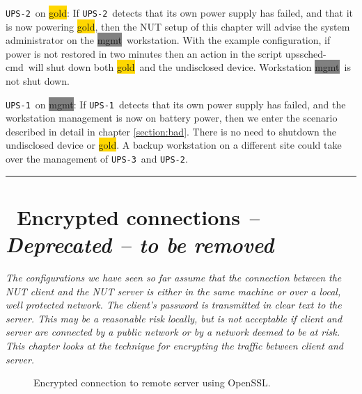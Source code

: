 \documentclass[12pt]{article}
\newlength{\headersep}\setlength{\headersep}{3mm}
\newcommand{\Hsep}{\hspace{\headersep}}
\newcommand{\newcolumn}{\vfill\eject}
\newcommand{\upsschedcmd}{\mbox{\textcolor{CMDCOLOUR}{upssched-cmd}}}
\newcommand{\gold}[1][gold]{\colorbox{GOLD}{#1}}
\newcommand{\mgmt}[1][mgmt]{\colorbox{GRAY}{#1}}
\newcommand{\UPSi}{\texttt{UPS-1}}
\newcommand{\UPSii}{\texttt{UPS-2}}
\newcommand{\UPSiii}{\texttt{UPS-3}}
\newcommand{\Ref}[1]{\ref{#1}}
\begin{document}
\UPSii\ on \gold: If \UPSii\ detects that its own power supply has failed, and
that it is now powering \gold, then the NUT setup of this chapter will advise
the system administrator on the \mgmt\ workstation.  With the example
configuration, if power is not restored in two minutes then an action in the
script \upsschedcmd\ will shut down both \gold\ and the undisclosed device.
Workstation \mgmt\ is not shut down.

\UPSi\ on \mgmt: If \UPSi\ detects that its own power supply has failed, and
the workstation management is now on battery power, then we enter the scenario
described in detail in chapter \Ref{section:bad}.  There is no need to shutdown
the undisclosed device or \gold.  A backup workstation on a different site
could take over the management of \UPSiii\ and \UPSii.

\vspace*{\fill}
\begin{center}\rule{\LinePrinterwidth}{0.5mm}\end{center}
\vspace*{\fill}

\begin{center}
\end{center}

\vspace*{\fill}


\newcolumn
\section{\Hsep\ Encrypted connections \textit{ -- Deprecated -- to be removed}}\label{section:SSL}

\textsl{The configurations we have seen so far assume that the
  connection between the NUT client and the NUT server is either in
  the same machine or over a local, well protected network.  The
  client's password is transmitted in clear text to the server.  This
  may be a reasonable risk locally, but is not acceptable if client
  and server are connected by a public network or by a network deemed
  to be at risk.  This chapter looks at the technique for encrypting
  the traffic between client and server.}

\begin{figure}[ht]
\begin{center}
\end{center}
\vspace{-6mm}
\caption{Encrypted connection to remote server using OpenSSL.\label{fig:SSL}}
\end{figure}
\end{document}
